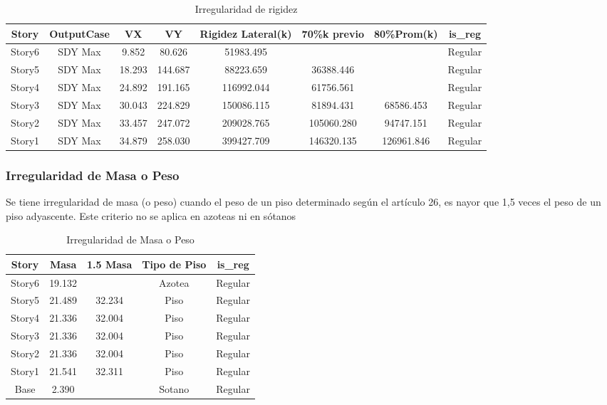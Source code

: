 \documentclass{article}%
\begin{document}
%


\begin{table}[h!]%
\centering%
\caption{Irregularidad de rigidez}%
\begin{tabular}{cccccccc}
\toprule
Story & OutputCase & VX & VY & Rigidez Lateral(k) & 70\%k previo & 80\%Prom(k) & is\_reg \\
\midrule
Story6 & SDY Max & 9.852 & 80.626 & 51983.495 &  &  & Regular \\
Story5 & SDY Max & 18.293 & 144.687 & 88223.659 & 36388.446 &  & Regular \\
Story4 & SDY Max & 24.892 & 191.165 & 116992.044 & 61756.561 &  & Regular \\
Story3 & SDY Max & 30.043 & 224.829 & 150086.115 & 81894.431 & 68586.453 & Regular \\
Story2 & SDY Max & 33.457 & 247.072 & 209028.765 & 105060.280 & 94747.151 & Regular \\
Story1 & SDY Max & 34.879 & 258.030 & 399427.709 & 146320.135 & 126961.846 & Regular \\
\bottomrule
\end{tabular}
%
\end{table}

%
\subsubsection{Irregularidad de Masa o Peso}%
\label{ssubsec:IrregularidaddeMasaoPeso}%
\begin{tcolorbox}[colback=gray!5!white,colframe=cyan!75!black,fonttitle=\bfseries,title=Tabla N°9 E-030]%
Se tiene irregularidad de masa (o peso) cuando el peso de un piso determinado según el artículo 26, es nayor que 1,5 veces el peso de un piso adyascente. Este criterio no se aplica en azoteas ni en sótanos%
\end{tcolorbox}%


\begin{table}[H]%
\centering%
\caption{Irregularidad de Masa o Peso}%
\begin{tabular}{ccccc}
\toprule
Story & Masa & 1.5 Masa & Tipo de Piso & is\_reg \\
\midrule
Story6 & 19.132 &  & Azotea & Regular \\
Story5 & 21.489 & 32.234 & Piso & Regular \\
Story4 & 21.336 & 32.004 & Piso & Regular \\
Story3 & 21.336 & 32.004 & Piso & Regular \\
Story2 & 21.336 & 32.004 & Piso & Regular \\
Story1 & 21.541 & 32.311 & Piso & Regular \\
Base & 2.390 &  & Sotano & Regular \\
\bottomrule
\end{tabular}
%
\end{table}
\end{document}
